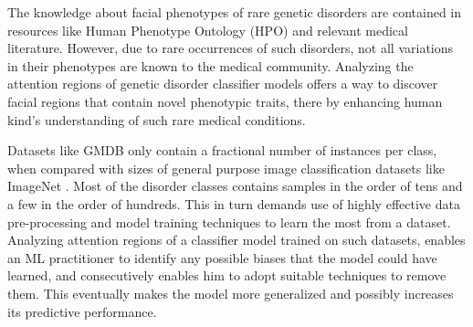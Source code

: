 \documentclass[../report.tex]{subfiles}
\begin{document}
    The knowledge about facial phenotypes of rare genetic disorders are contained in resources like Human Phenotype Ontology (HPO) \cite{hpo} and relevant medical literature. However, due to rare occurrences of such disorders, not all variations in their phenotypes are known to the medical community. Analyzing the attention regions of genetic disorder classifier models offers a way to discover facial regions that contain novel phenotypic traits, there by enhancing human kind's understanding of such rare medical conditions.
    
    Datasets like GMDB \cite{gmdb} only contain a fractional number of instances per class, when compared with sizes of general purpose image classification datasets like ImageNet \cite{deng2009imagenet}. Most of the disorder classes contains samples in the order of tens and a few in the order of hundreds. This in turn demands use of highly effective data pre-processing and model training techniques to learn the most from a dataset. Analyzing attention regions of a classifier model trained on such datasets, enables an ML practitioner to identify any possible biases that the model could have learned, and consecutively enables him to adopt suitable techniques to remove them. This eventually makes the model more generalized and possibly increases its predictive performance. 
    
\end{document}
